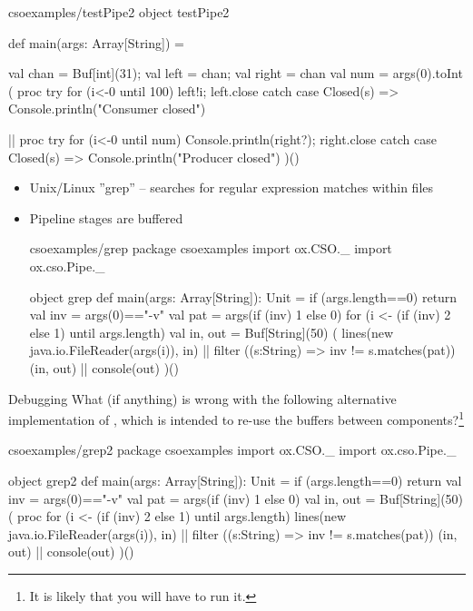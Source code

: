 \documentclass{concdistfoils}
\begin{document}
\begin{slide}
\begin{note}
\begin{obj}{csoexamples/testPipe2}
object testPipe2
{ def main(args: Array[String]) =
  { val chan = Buf[int](31); val left = chan;  val right = chan
    val num  = args(0).toInt
    (  proc 
       { try   { for (i<-0 until 100) left!i; left.close } 
         catch { case Closed(s) => Console.println("Consumer closed") }}   
                      
    || proc 
       { try   { for (i<-0 until num) Console.println(right?); right.close }
         catch { case Closed(s) => Console.println("Producer closed") }}
    )()
  }
}
\end{obj}
\end{note}
\end{slide}

\begin{slide}
\begin{itemize}
\item Unix/Linux ''grep'' -- searches for regular expression matches within files
\item Pipeline stages are buffered
\begin{obj}{csoexamples/grep}
package csoexamples
import  ox.CSO._
import  ox.cso.Pipe._

object grep
{ def main(args: Array[String]): Unit = 
  { if (args.length==0) return
    val inv = args(0)=="-v"
    val pat = args(if (inv) 1 else 0)
    for (i <- (if (inv) 2 else 1) until args.length)
    { val in, out  = Buf[String](50)
      (  lines(new java.io.FileReader(args(i)), in)
      || filter ((s:String) => inv != s.matches(pat)) (in, out) 
      || console(out) 
      )()
    }
  }
}
\end{obj}
\end{itemize}
\begin{ex**}{Debugging}
What (if anything) is wrong with the following alternative implementation of 
, which is intended to re-use the buffers between components?\footnote{It is likely that you will have to run it.}

\begin{obj*}{csoexamples/grep2}
package csoexamples
import  ox.CSO._
import  ox.cso.Pipe._

object grep2
{ def main(args: Array[String]): Unit = 
  { if (args.length==0) return
    val inv = args(0)=="-v"
    val pat = args(if (inv) 1 else 0)
    val in, out  = Buf[String](50) 
      (  proc { for (i <- (if (inv) 2 else 1) until args.length) lines(new java.io.FileReader(args(i)), in) }
      || filter ((s:String) => inv != s.matches(pat)) (in, out) 
      || console(out) 
      )()
  }
}
\end{obj*}


\end{ex**}
\end{slide}
\end{document}
